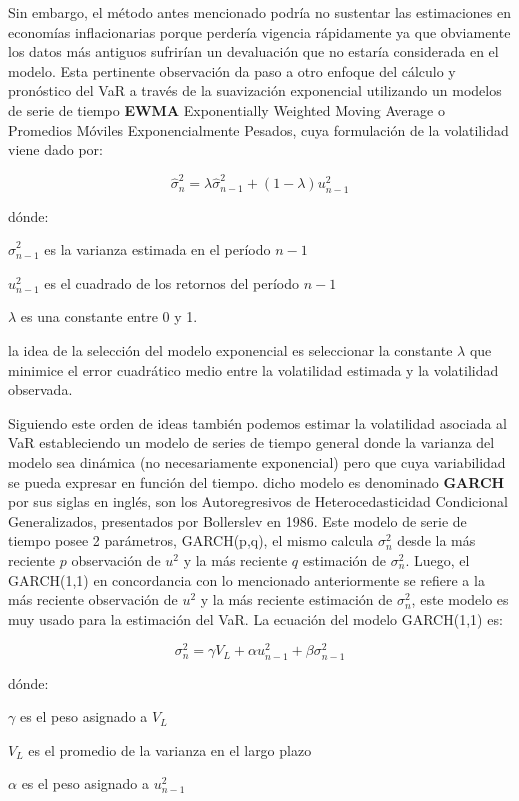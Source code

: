 \documentclass[]{article}
\begin{document}
Sin embargo, el método antes mencionado podría no sustentar las
estimaciones en economías inflacionarias porque perdería vigencia
rápidamente ya que obviamente los datos más antiguos sufrirían un
devaluación que no estaría considerada en el modelo. Esta pertinente
observación da paso a otro enfoque del cálculo y pronóstico del VaR a
través de la suavización exponencial utilizando un modelos de serie de
tiempo \textbf{EWMA} Exponentially Weighted Moving Average o Promedios
Móviles Exponencialmente Pesados, cuya formulación de la volatilidad
viene dado por:

\[\hat{\sigma}_n^2 = \lambda \hat{\sigma}_{n-1}^2 + (1 - \lambda) u_{n-1}^2\]

dónde:

\(\hat{\sigma}_{n-1}^2\) es la varianza estimada en el período \(n-1\)

\(u_{n-1}^2\) es el cuadrado de los retornos del período \(n-1\)

\(\lambda\) es una constante entre 0 y 1.

la idea de la selección del modelo exponencial es seleccionar la
constante \(\lambda\) que minimice el error cuadrático medio entre la
volatilidad estimada y la volatilidad observada.

Siguiendo este orden de ideas también podemos estimar la volatilidad
asociada al VaR estableciendo un modelo de series de tiempo general
donde la varianza del modelo sea dinámica (no necesariamente
exponencial) pero que cuya variabilidad se pueda expresar en función del
tiempo. dicho modelo es denominado \textbf{GARCH} por sus siglas en
inglés, son los Autoregresivos de Heterocedasticidad Condicional
Generalizados, presentados por Bollerslev en 1986. Este modelo de serie
de tiempo posee 2 parámetros, GARCH(p,q), el mismo calcula
\(\sigma_n^2\) desde la más reciente \(p\) observación de \(u^2\) y la
más reciente \(q\) estimación de \(\sigma_n^2\). Luego, el GARCH(1,1) en
concordancia con lo mencionado anteriormente se refiere a la más
reciente observación de \(u^2\) y la más reciente estimación de
\(\sigma_n^2\), este modelo es muy usado para la estimación del VaR. La
ecuación del modelo GARCH(1,1) es:

\[\sigma_n^2 = \gamma V_L + \alpha u_{n-1}^2 + \beta \sigma_{n-1}^2\]

dónde:

\(\gamma\) es el peso asignado a \(V_L\)

\(V_L\) es el promedio de la varianza en el largo plazo

\(\alpha\) es el peso asignado a \(u_{n-1}^2\)
\end{document}
